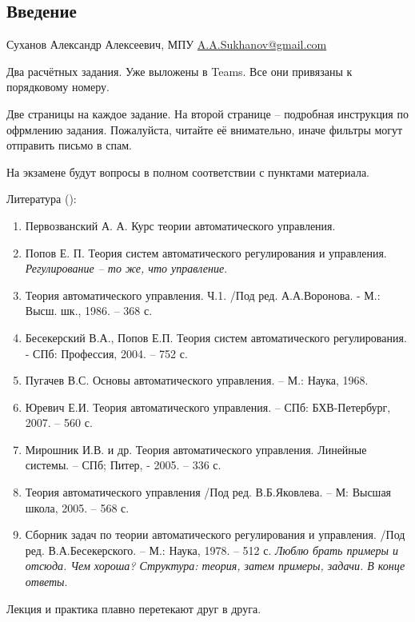 \documentclass[main.tex]{subfiles}
\begin{document}
\subsection{Введение}

Суханов Александр Алексеевич, МПУ \href{mailto:A.A.Sukhanov@gmail.com}{A.A.Sukhanov@gmail.com}

Два расчётных задания.
Уже выложены в Teams.
Все они привязаны к порядковому номеру.

Две страницы на каждое задание.
На второй странице -- подробная инструкция по офрмлению задания.
Пожалуйста, читайте её внимательно, иначе фильтры могут отправить письмо в спам.

На экзамене будут вопросы в полном соответствии с пунктами материала.

Литература ():
\begin{enumerate}[noitemsep]
	\item Первозванский А. А. Курс теории автоматического управления.
	\item Попов Е. П. Теория систем автоматического регулирования и управления. \emph{Регулирование -- то же, что управление}.
	\item Теория автоматического управления. Ч.1. /Под ред. А.А.Воронова. - М.: Высш. шк., 1986. – 368 с.
	\item Бесекерский В.А., Попов Е.П. Теория систем автоматического регулирования. - СПб: Профессия, 2004. – 752 с.

	\item Пугачев В.С. Основы автоматического управления. – М.: Наука, 1968.

	\item Юревич Е.И. Теория автоматического управления. – СПб: БХВ-Петербург, 2007. – 560 с.

	\item Мирошник И.В. и др. Теория автоматического управления. Линейные системы. – СПб; Питер, - 2005. – 336 с.
	\item Теория автоматического управления /Под ред. В.Б.Яковлева. – М: Высшая школа, 2005. – 568 с.
	\item Сборник задач по теории автоматического регулирования и управления. /Под ред. В.А.Бесекерского. – М.: Наука, 1978. – 512 с. \emph{Люблю брать примеры и отсюда. Чем хороша? Структура: теория, затем примеры, задачи. В конце ответы}.
\end{enumerate}

Лекция и практика плавно перетекают друг в друга.
\end{document}

